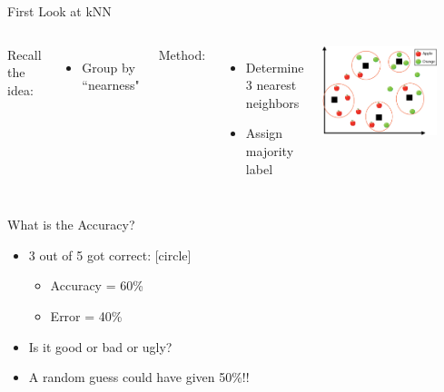 \documentclass[aspectratio=169,14pt,usenames,dvipsnames]{beamer}
\begin{document}
\begin{frame}{First Look at kNN}
\begin{columns}
\alert{Recall the idea:}
\begin{itemize}
  \item Group by ``nearness"
\end{itemize}
\alert{Method:}
\begin{itemize}
\item Determine 3 nearest neighbors
\item Assign majority label
\end{itemize}
\includegraphics[width=0.8\textwidth, height=0.6\textheight]{Images/6knn.png}
\end{columns}
\end{frame}


\begin{frame}{What is the Accuracy?}
\begin{itemize}
\item 3 out of 5 got correct:
[circle]
\begin{itemize}
\item Accuracy = 60\%
\item Error = 40\%
\end{itemize}
\item Is it good or bad or ugly?
\item<2> A random guess could have given 50\%!!
\end{itemize}
\end{frame}
\end{document}
